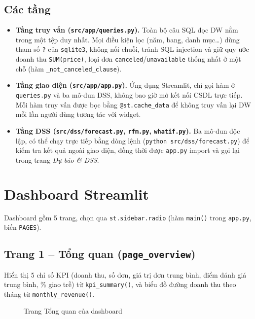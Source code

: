 \documentclass[12pt,a4paper]{article}
\newcommand{\code}[1]{\texttt{\small #1}}
\begin{document}
\subsection{Các tầng}
\begin{itemize}[nosep]
  \item \textbf{Tầng truy vấn (\code{src/app/queries.py}).} Toàn bộ câu SQL đọc DW nằm trong một tệp duy nhất.
        Mọi điều kiện lọc (năm, bang, danh mục\ldots) dùng tham số \code{?} của \code{sqlite3}, không nối chuỗi,
        tránh SQL injection và giữ quy ước doanh thu \code{SUM(price)}, loại đơn \code{canceled}/\code{unavailable}
        thống nhất ở một chỗ (hàm \code{\_not\_canceled\_clause}).
  \item \textbf{Tầng giao diện (\code{src/app/app.py}).} Ứng dụng Streamlit, chỉ gọi hàm ở \code{queries.py}
        và ba mô-đun DSS, không bao giờ mở kết nối CSDL trực tiếp. Mỗi hàm truy vấn được bọc bằng
        \code{@st.cache\_data} để không truy vấn lại DW mỗi lần người dùng tương tác với widget.
  \item \textbf{Tầng DSS (\code{src/dss/forecast.py}, \code{rfm.py}, \code{whatif.py}).} Ba mô-đun độc lập, có thể
        chạy trực tiếp bằng dòng lệnh (\code{python src/dss/forecast.py}) để kiểm tra kết quả ngoài giao diện,
        đồng thời được \code{app.py} import và gọi lại trong trang \emph{Dự báo \& DSS}.
\end{itemize}

\section{Dashboard Streamlit}

Dashboard gồm 5 trang, chọn qua \code{st.sidebar.radio} (hàm \code{main()} trong \code{app.py}, biến \code{PAGES}).

\subsection{Trang 1 -- Tổng quan (\code{page\_overview})}
Hiển thị 5 chỉ số KPI (doanh thu, số đơn, giá trị đơn trung bình, điểm đánh giá trung bình, \% giao trễ) từ
\code{kpi\_summary()}, và biểu đồ đường doanh thu theo tháng từ \code{monthly\_revenue()}.

\begin{figure}[h]
\centering
{}
\caption{Trang Tổng quan của dashboard}\label{fig:ss-overview}
\end{figure}
\end{document}
